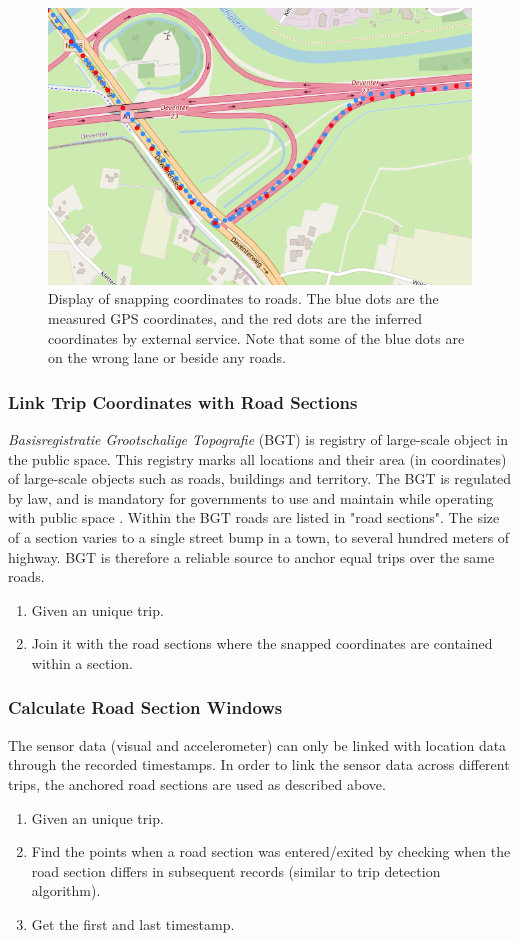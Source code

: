 \begin{figure}[H]
\begin{center}
\includegraphics[width=.7\textwidth,keepaspectratio]{images/4_data/snap-trips.png}
\end{center}
\caption{Display of snapping coordinates to roads. The blue dots are the measured GPS coordinates, and the red dots are the inferred coordinates by external service. Note that some of the blue dots are on the wrong lane or beside any roads.}
\label{fig:snap-trips}
\end{figure}

\subsubsection{Link Trip Coordinates with Road Sections}
\textit{Basisregistratie Grootschalige Topografie} (BGT) is registry of large-scale object in the public space. This registry marks all locations and their area (in coordinates) of large-scale objects such as roads, buildings and territory. The BGT is regulated by law, and is mandatory for governments to use and maintain while operating with public space \cite{BGT}. Within the BGT roads are listed in "road sections". The size of a section varies to a single street bump in a town, to several hundred meters of highway. BGT is therefore a reliable source to anchor equal trips over the same roads.
\begin{enumerate}
\item Given an unique trip.
\item Join it with the road sections where the snapped coordinates are contained within a section.
\end{enumerate}


\subsubsection{Calculate Road Section Windows}
The sensor data (visual and accelerometer) can only be linked with location data through the recorded timestamps. In order to link the sensor data across different trips, the anchored road sections are used as described above. 
\begin{enumerate}
\item Given an unique trip.
\item Find the points when a road section was entered/exited by checking when the road section differs in subsequent records (similar to trip detection algorithm).
\item Get the first and last timestamp.
\end{enumerate}


